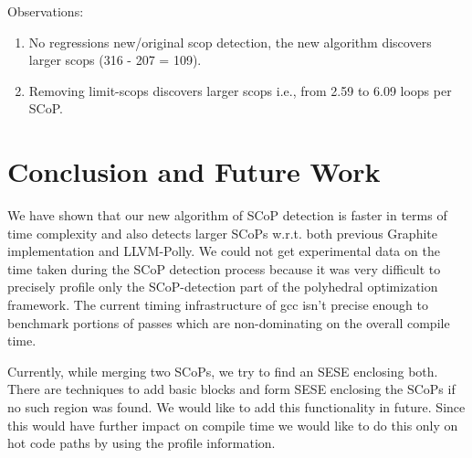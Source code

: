 \documentclass{sigplanconf}
\begin{document}
Observations:
\begin{enumerate}
  \item No regressions new/original scop detection, the new algorithm discovers
    larger scops (316 - 207 = 109).
  \item Removing limit-scops discovers larger scops i.e., from 2.59 to 6.09
    loops per SCoP.
\end{enumerate}

\section{Conclusion and Future Work}
We have shown that our new algorithm of SCoP detection is faster in terms of
time complexity and also detects larger SCoPs w.r.t. both previous Graphite
implementation and LLVM-Polly. We could not get experimental data on the time
taken during the SCoP detection process because it was very difficult to
precisely profile only the SCoP-detection part of the polyhedral optimization
framework. The current timing infrastructure of gcc isn't precise enough to
benchmark portions of passes which are non-dominating on the overall compile
time.

Currently, while merging two SCoPs, we try to find an SESE enclosing both. There
are techniques to add basic blocks and form SESE enclosing the SCoPs if no such
region was found. We would like to add this functionality in future. Since this
would have further impact on compile time we would like to do this only on hot
code paths by using the profile information.



{\small

}
\end{document}
